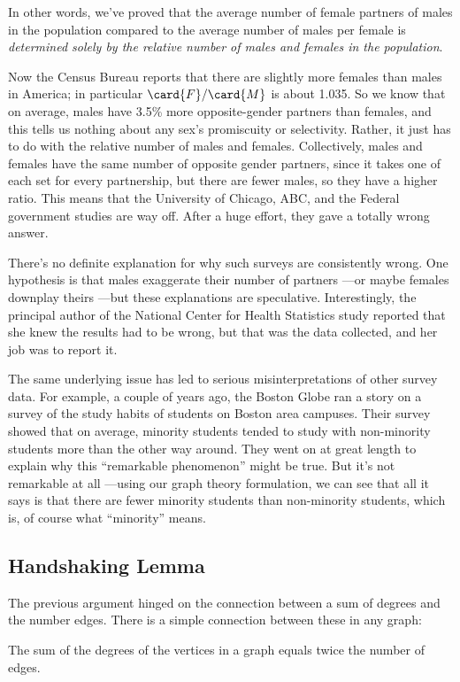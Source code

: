 In other words, we've proved that the average number of female
partners of males in the population compared to the average number of
males per female is \emph{determined solely by the relative number of
  males and females in the population}.

Now the Census Bureau reports that there are slightly more females
than males in America; in particular $\card{F} / \card{M}$ is about
1.035.  So we know that on average, males have 3.5\% more
opposite-gender partners than females, and this tells us nothing about
any sex's promiscuity or selectivity.  Rather, it just has to do with
the relative number of males and females.  Collectively, males and
females have the same number of opposite gender partners, since it
takes one of each set for every partnership, but there are fewer
males, so they have a higher ratio.  This means that the University of
Chicago, ABC, and the Federal government studies are way off.  After a
huge effort, they gave a totally wrong answer.

There's no definite explanation for why such surveys are consistently
wrong.  One hypothesis is that males exaggerate their number of
partners ---or maybe females downplay theirs ---but these explanations
are speculative.  Interestingly, the principal author of the National
Center for Health Statistics study reported that she knew the results
had to be wrong, but that was the data collected, and her job was to
report it.

The same underlying issue has led to serious misinterpretations of
other survey data.  For example, a couple of years ago, the Boston
Globe ran a story on a survey of the study habits of students on
Boston area campuses.  Their survey showed that on average, minority
students tended to study with non-minority students more than the
other way around.  They went on at great length to explain why this
``remarkable phenomenon'' might be true.  But it's not remarkable at
all ---using our graph theory formulation, we can see that all it says
is that there are fewer minority students than non-minority students,
which is, of course what ``minority'' means.

\subsection{Handshaking Lemma}
The previous argument hinged on the connection between a sum of
degrees and the number edges.  There is a simple connection between
these in any graph:

\begin{lemma}\label{sumedges}
The sum of the degrees of the vertices in a graph equals twice the number of edges.
\end{lemma}

